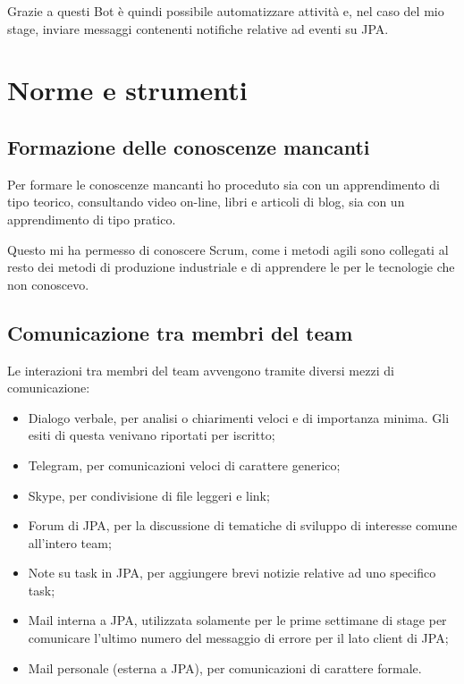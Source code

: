 Grazie a questi Bot è quindi possibile automatizzare attività e, nel caso del
mio stage, inviare messaggi contenenti notifiche relative ad eventi su JPA.

\section{Norme e strumenti}

\subsection{Formazione delle conoscenze mancanti}

Per formare le conoscenze mancanti ho proceduto sia con un apprendimento di
tipo teorico, consultando video on-line, libri e articoli di blog, sia con un
apprendimento di tipo pratico.

Questo mi ha permesso di conoscere Scrum, come i metodi agili sono collegati
al resto dei metodi di produzione industriale e di apprendere le
 per le tecnologie che non conoscevo.

\subsection{Comunicazione tra membri del team}

Le interazioni tra membri del team avvengono tramite diversi mezzi di
comunicazione:

\begin{itemize}
\item Dialogo verbale, per analisi o chiarimenti veloci e di importanza minima.
  Gli esiti di questa venivano riportati per iscritto;
\item Telegram, per comunicazioni veloci di carattere generico;
\item Skype, per condivisione di file leggeri e link;
\item Forum di JPA, per la discussione di tematiche di sviluppo di interesse
  comune all'intero team;
\item Note su task in JPA, per aggiungere brevi notizie relative ad uno
  specifico task;
\item Mail interna a JPA, utilizzata solamente per le prime settimane di stage
  per comunicare l'ultimo numero del messaggio di errore per il lato client di
  JPA;
\item Mail personale (esterna a JPA), per comunicazioni di carattere formale.
\end{itemize}

